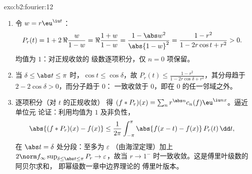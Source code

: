 \begin{solution}{exo:b2:fourier:12}
\begin{enumerate}
  \item 令 $w = r\eu^{\iu t}$：
        \[
        P_r(t) = 1 + 2\,\Re\frac{w}{1 - w}
        = \Re\frac{1 + w}{1 - w}
        = \frac{1 - \abs w^2}{\abs{1 - w}^2}
        = \frac{1 - r^2}{1 - 2r\cos t + r^2} > 0 .
        \]
        均值为 $1$：对正规收敛的
        级数逐项积分，仅 $n = 0$ 项保留。
  \item 当 $\delta \leq \abs t \leq \pi$ 时，$\cos t \leq
        \cos\delta$，故 $P_r(t) \leq \frac{1 - r^2}{1 -
        2r\cos\delta + r^2}$，其分母趋于 $2 -
        2\cos\delta > 0$，而分子趋于 $0$：
        一致收敛于 $0$，即在
        $0$ 的任一邻域之外。
  \item 逐项积分（对 $t$ 的正规收敛）
        得 $(f * P_r)(x) = \sum_n r^{\abs
        n}c_n(f)\eu^{\iu nx}$。逼近单位元
        论证：利用均值为 $1$ 及非负性，
        \[
        \abs{(f*P_r)(x) - f(x)}
        \leq \frac{1}{2\pi}\int_{-\pi}^{\pi}
        \abs{f(x-t) - f(x)}\,P_r(t)\,\dd t ,
        \]
        在 $\abs t = \delta$ 处分段：至多为 $\varepsilon$
        （由海涅定理）加上 $2\norm f_\infty\sup_{\delta\leq\abs
        t\leq\pi}P_r \to \varepsilon$，故当
        $r \to 1^-$ 时一致收敛。这是傅里叶级数的阿贝尔求和，
        即幂级数一章中边界理论的
        傅里叶版本。
\end{enumerate}
\end{solution}

